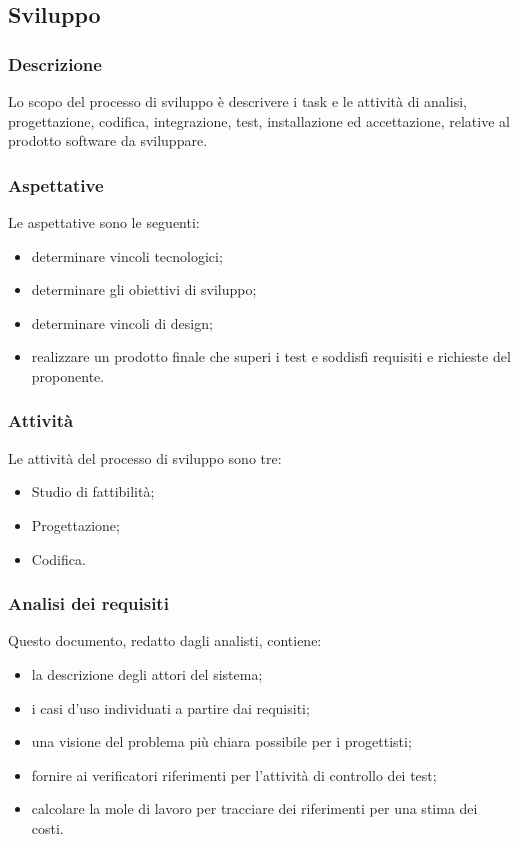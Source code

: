 \subsection{Sviluppo}
\subsubsection{Descrizione}
Lo scopo del processo di sviluppo è descrivere i task e le attività di analisi, progettazione, codifica, integrazione, test, installazione ed accettazione, relative al prodotto software da sviluppare.
\subsubsection{Aspettative}
Le aspettative sono le seguenti:
\begin{itemize}
\item determinare vincoli tecnologici;
\item determinare gli obiettivi di sviluppo;
\item determinare vincoli di design;
\item realizzare un prodotto finale che superi i test e soddisfi requisiti e richieste del proponente.
\end{itemize}
\subsubsection{Attività}
Le attività del processo di sviluppo sono tre:
\begin{itemize}
\item Studio di fattibilità;
\item Progettazione;
\item Codifica.
\end{itemize}
\subsubsection{Analisi dei requisiti}
Questo documento, redatto dagli analisti, contiene:
\begin{itemize}
\item la descrizione degli attori del sistema;
\item i casi d'uso individuati a partire dai requisiti;
\item una visione del problema più chiara possibile per i progettisti;
\item fornire ai verificatori riferimenti per l'attività di controllo dei test;
\item calcolare la mole di lavoro per tracciare dei riferimenti per una stima dei costi.
\end{itemize}
